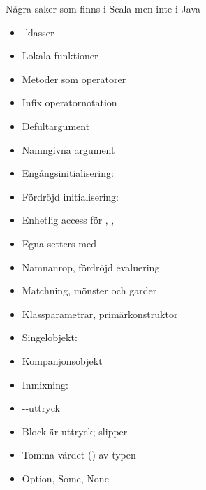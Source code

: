 \begin{Slide}{Några saker som finns i Scala men inte i Java}\SlideFontSmall
\vspace{-1em}\begin{multicols}{2}
\begin{itemize}
\item {}-klasser

\item Lokala funktioner

\item Metoder som operatorer 

\item Infix operatornotation

\item Defultargument

\item Namngivna argument

\item Engångsinitialisering: 

\item Fördröjd initialisering: 

\item Enhetlig access för , , 

\item Egna setters med 

\item Namnanrop, fördröjd evaluering

\item Matchning, mönster och garder

\item Klassparametrar, primärkonstruktor

\item Singelobjekt: 

\item Kompanjonsobjekt

\item Inmixning:  

\item {}--uttryck

\item Block är uttryck; slipper 

\item Tomma värdet () av typen 

\item Option, Some, None


\end{itemize}
\end{multicols}
\end{Slide}
